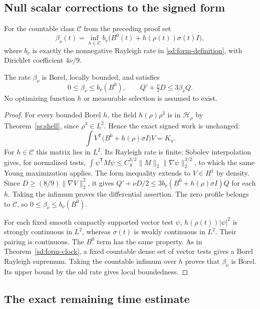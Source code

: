 \subsection{Null scalar corrections to the signed form}

For the countable class $\mathcal C$ from the preceding proof set
\begin{equation}\label{ss:gauge-definition}
 \beta_\nu(t)=\inf_{h\in\mathcal C}
 b_\nu\bigl(B^0(t)+h(\rho(t))\sigma(t)I\bigr),
\end{equation}
where $b_\nu$ is exactly the nonnegative Rayleigh rate in
\eqref{sd:form-definition}, with Dirichlet coefficient $4\nu/9$.

\begin{proposition}\label{ss:gauge}
The rate $\beta_\nu$ is Borel, locally bounded, and satisfies
\[
 0\le\beta_\nu\le b_\nu(B^0),\qquad
 Q'+\tfrac\nu2D\le3\beta_\nu Q.
\]
No optimizing function $h$ or measurable selection is assumed to exist.
\end{proposition}
\begin{proof}
For every bounded Borel $h$, the field $h(\rho)\rho^3$ is in
$\mathcal H_\rho$ by Theorem~\ref{ss:shell}, since $\rho^3\in L^2$.
Hence the exact signed work is unchanged:
\[
 \int V^{\mathsf T}\bigl(B^0+h(\rho)\sigma I\bigr)V=K_u.
\]
For $h\in\mathcal C$ this matrix lies in $L^2$. Its Rayleigh rate is
finite: Sobolev interpolation gives, for normalized tests,
$\int\psi^{\mathsf T}M\psi\le
C_S^{3/2}\|M\|_2\|\nabla\psi\|_2^{3/2}$, to which the same Young
maximization applies. The form inequality extends to $V\in H^1$ by
density. Since $D\ge(8/9)\|\nabla V\|_2^2$, it gives
$Q'+\nu D/2\le3b_\nu(B^0+h(\rho)\sigma I)Q$ for each $h$.
Taking the infimum proves the differential assertion. The zero profile
belongs to $\mathcal C$, so $0\le\beta_\nu\le b_\nu(B^0)$.

For each fixed smooth compactly supported vector test $\psi$,
$h(\rho(t))|\psi|^2$ is strongly continuous in $L^2$, whereas
$\sigma(t)$ is weakly continuous in $L^2$. Their pairing is continuous.
The $B^0$ term has the same property. As in Theorem~\ref{sd:form-clock},
a fixed countable dense set of vector tests gives a Borel Rayleigh
supremum. Taking the countable infimum over $h$ proves that $\beta_\nu$
is Borel. Its upper bound by the old rate gives local boundedness.
\end{proof}

\subsection{The exact remaining time estimate}

